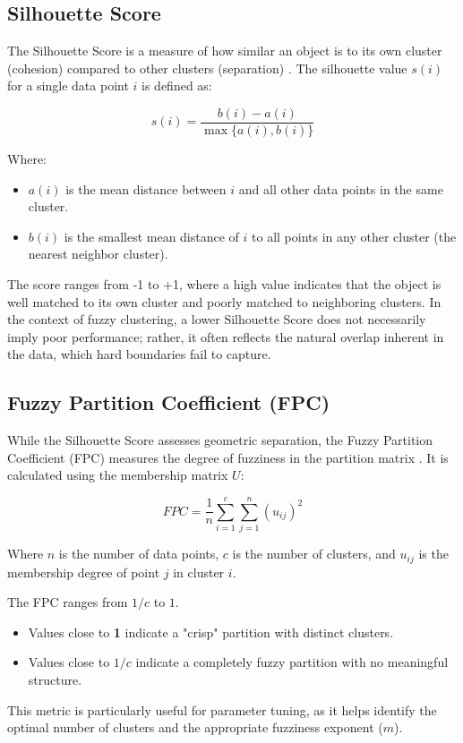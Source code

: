 \documentclass[12pt, a4paper]{article}
\begin{document}
\subsection{Silhouette Score}
The Silhouette Score is a measure of how similar an object is to its own cluster (cohesion) compared to other clusters (separation) \cite{rousseeuw1987silhouettes}. The silhouette value $s(i)$ for a single data point $i$ is defined as:

\begin{equation}
s(i) = \frac{b(i) - a(i)}{\max\{a(i), b(i)\}}
\end{equation}

Where:
\begin{itemize}
    \item $a(i)$ is the mean distance between $i$ and all other data points in the same cluster.
    \item $b(i)$ is the smallest mean distance of $i$ to all points in any other cluster (the nearest neighbor cluster).
\end{itemize}

The score ranges from -1 to +1, where a high value indicates that the object is well matched to its own cluster and poorly matched to neighboring clusters. In the context of fuzzy clustering, a lower Silhouette Score does not necessarily imply poor performance; rather, it often reflects the natural overlap inherent in the data, which hard boundaries fail to capture.

\subsection{Fuzzy Partition Coefficient (FPC)}
While the Silhouette Score assesses geometric separation, the Fuzzy Partition Coefficient (FPC) measures the degree of fuzziness in the partition matrix \cite{bezdek1981pattern}. It is calculated using the membership matrix $U$:

\begin{equation}
FPC = \frac{1}{n} \sum_{i=1}^c \sum_{j=1}^n (u_{ij})^2
\end{equation}

Where $n$ is the number of data points, $c$ is the number of clusters, and $u_{ij}$ is the membership degree of point $j$ in cluster $i$.

The FPC ranges from $1/c$ to $1$.
\begin{itemize}
    \item Values close to \textbf{1} indicate a "crisp" partition with distinct clusters.
    \item Values close to \textbf{$1/c$} indicate a completely fuzzy partition with no meaningful structure.
\end{itemize}
This metric is particularly useful for parameter tuning, as it helps identify the optimal number of clusters and the appropriate fuzziness exponent ($m$).
\end{document}
